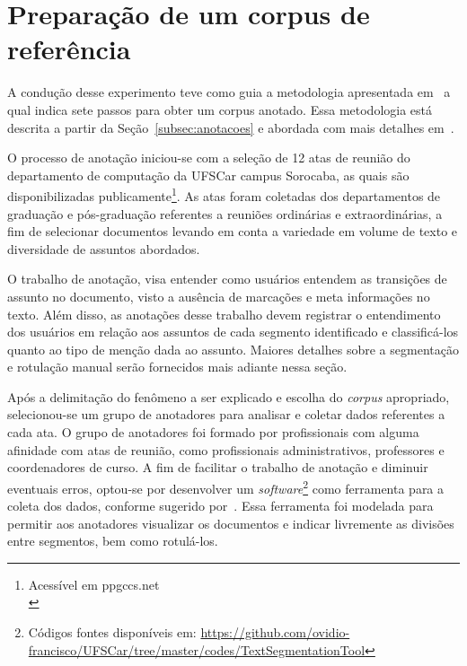 
\section{Preparação de um corpus de referência}




A condução desse experimento teve como guia a metodologia apresentada em~\cite{Hovy2010} a qual indica sete passos para obter um corpus anotado. Essa metodologia está descrita a partir da Seção~\ref{subsec:anotacoes} e abordada com mais detalhes em~\cite{Cardoso2017}. 



O processo de anotação iniciou-se com a seleção de 12 atas de reunião do departamento de computação da UFSCar campus Sorocaba, as quais são disponibilizadas publicamente\footnote{Acessível em ppgccs.net\\ }. As atas foram coletadas dos departamentos de graduação e pós-graduação referentes a reuniões ordinárias e extraordinárias, a fim de selecionar documentos levando em conta a variedade em volume de texto e diversidade de assuntos abordados.

O trabalho de anotação, visa entender como usuários entendem as transições de assunto no documento, visto a ausência de marcações e meta informações no texto. Além disso, as anotações desse trabalho devem registrar o entendimento dos usuários em relação aos assuntos de cada segmento identificado e classificá-los quanto ao tipo de menção dada ao assunto. Maiores detalhes sobre a segmentação e rotulação manual serão fornecidos mais adiante nessa seção.


Após a delimitação do fenômeno a ser explicado e escolha do \textit{corpus} apropriado, selecionou-se um grupo de anotadores para analisar e coletar dados referentes a cada ata. O grupo de anotadores foi formado por profissionais com alguma afinidade com atas de reunião, como profissionais administrativos, professores e coordenadores de curso. 
A fim de facilitar o trabalho de anotação e diminuir eventuais erros, optou-se por desenvolver um \textit{software}\footnote{Códigos fontes disponíveis em: \url{https://github.com/ovidio-francisco/UFSCar/tree/master/codes/TextSegmentationTool} } como ferramenta para a coleta dos dados, conforme sugerido por~\cite{Hovy2010}. Essa ferramenta foi modelada para permitir aos anotadores visualizar os documentos e indicar livremente as divisões entre segmentos, bem como rotulá-los. 

